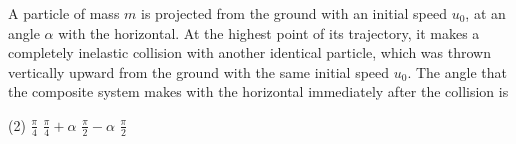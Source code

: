 
\item A particle of mass \(m\) is projected from the ground with an initial speed \(u_0\), at an angle \(\alpha\) with the horizontal. At the highest point of its trajectory, it makes a completely inelastic collision with another identical particle, which was thrown vertically upward from the ground with the same initial speed \(u_0\). The angle that the composite system makes with the horizontal immediately after the collision is
    \begin{tasks}(2)
        \task \(\frac{\pi}{4}\)
        \task \(\frac{\pi}{4} + \alpha\)
        \task \(\frac{\pi}{2} - \alpha\)\ans
        \task \(\frac{\pi}{2}\)
    \end{tasks}
